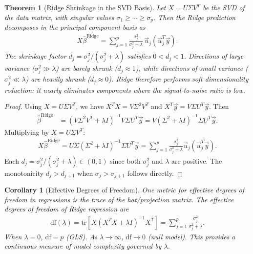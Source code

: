 \documentclass[11pt]{article}
\theoremstyle{definition}
\theoremstyle{plain}
\newtheorem{theorem}{Theorem}[section]
\newtheorem{corollary}{Corollary}[section]
\theoremstyle{remark}
\begin{document}
\begin{theorem}[Ridge Shrinkage in the SVD Basis]\label{thm:ridge-svd}
    Let $X = U\Sigma V^T$ be the SVD of the data matrix, with singular values $\sigma_1 \geq \cdots \geq \sigma_p$. Then the Ridge prediction decomposes in the principal component basis as
    \begin{align}
        X\hat{\beta}^{\mathrm{Ridge}} = \sum_{j=1}^p \frac{\sigma_j^2}{\sigma_j^2 + \lambda}\,\vec{u}_j(\vec{u}_j^T\vec{y}).
    \end{align}
    The shrinkage factor $d_j = \sigma_j^2/(\sigma_j^2 + \lambda)$ satisfies $0 < d_j < 1$. Directions of large variance ($\sigma_j^2 \gg \lambda$) are barely shrunk ($d_j \approx 1$), while directions of small variance ($\sigma_j^2 \ll \lambda$) are heavily shrunk ($d_j \approx 0$). Ridge therefore performs \emph{soft dimensionality reduction}: it nearly eliminates components where the signal-to-noise ratio is low.
\end{theorem}
\begin{proof}
    Using $X = U\Sigma V^T$, we have $X^TX = V\Sigma^2 V^T$ and $X^T\vec{y} = V\Sigma U^T\vec{y}$. Then
    \begin{align}
        \hat{\beta}^{\mathrm{Ridge}} &= (V\Sigma^2 V^T + \lambda I)^{-1}V\Sigma U^T\vec{y} = V(\Sigma^2 + \lambda I)^{-1}\Sigma U^T\vec{y}.
    \end{align}
    Multiplying by $X = U\Sigma V^T$:
    \begin{align}
        X\hat{\beta}^{\mathrm{Ridge}} = U\Sigma (\Sigma^2 + \lambda I)^{-1}\Sigma U^T\vec{y} = \sum_{j=1}^p \frac{\sigma_j^2}{\sigma_j^2 + \lambda}\vec{u}_j(\vec{u}_j^T\vec{y}).
    \end{align}
    Each $d_j = \sigma_j^2/(\sigma_j^2+\lambda) \in (0,1)$ since both $\sigma_j^2$ and $\lambda$ are positive. The monotonicity $d_j > d_{j+1}$ when $\sigma_j > \sigma_{j+1}$ follows directly.
\end{proof}

\begin{corollary}[Effective Degrees of Freedom]
    One metric for effective degrees of freedom in regressions is the trace of the hat/projection matrix. The effective degrees of freedom of Ridge regression are
    \begin{align}
        \mathrm{df}(\lambda) = \mathrm{tr}\left[X(X^TX + \lambda I)^{-1}X^T\right] = \sum_{j=1}^p \frac{\sigma_j^2}{\sigma_j^2 + \lambda}.
    \end{align}
    When $\lambda = 0$, $\mathrm{df} = p$ (OLS). As $\lambda \to \infty$, $\mathrm{df} \to 0$ (null model). This provides a continuous measure of model complexity governed by $\lambda$.
\end{corollary}
\end{document}
